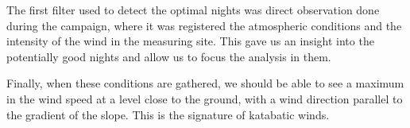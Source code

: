 The first filter used to detect the optimal nights was direct observation done during the campaign, where it was registered the atmospheric conditions and the intensity of the wind in the measuring site. This gave us an insight into the potentially good nights and allow us to focus the analysis in them.

Finally, when these conditions are gathered, we should be able to see a maximum in the wind speed at a level close to the ground, with a wind direction parallel to the gradient of the slope. This is the signature of katabatic winds.